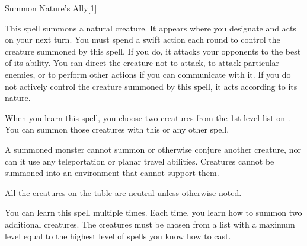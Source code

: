\begin{spellsection}{Summon Nature's Ally}[1]
    \begin{spellheader}
    \end{spellheader}
    \begin{spellcontent}
        \begin{spelltargetinginfo}
            \spellrng{\rngclose}
        \end{spelltargetinginfo}
        \begin{spelleffects}
            \spelleffect This spell summons a natural creature. It appears where you designate and acts on your next turn. You must spend a swift action each round to control the creature summoned by this spell. If you do, it attacks your opponents to the best of its ability. You can direct the creature not to attack, to attack particular enemies, or to perform other actions if you can communicate with it. If you do not actively control the creature summoned by this spell, it acts according to its nature.
            \par When you learn this spell, you choose two creatures from the 1st-level list on . You can summon those creatures with this or any other  spell.
            \par A summoned monster cannot summon or otherwise conjure another creature, nor can it use any teleportation or planar travel abilities. Creatures cannot be summoned into an environment that cannot support them.
            \par All the creatures on the table are neutral unless otherwise noted.
            \spelldur \durshort \dismissable
        \end{spelleffects}
    \end{spellcontent}
    \begin{spellfooter}
        \spellnotes You can learn this spell multiple times. Each time, you learn how to summon two additional creatures. The creatures must be chosen from a list with a maximum level equal to the highest level of spells you know how to cast.
        \miscastexplode
    \end{spellfooter}
    \begin{spellaugments}
    \end{spellaugments}
\end{spellsection}

